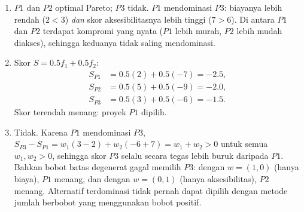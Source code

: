 \begin{enumerate}
\item $P1$ dan $P2$ optimal Pareto; $P3$ tidak. $P1$ mendominasi $P3$: biayanya
lebih rendah ($2 < 3$) \emph{dan} skor aksesibilitasnya lebih tinggi ($7 > 6$).
Di antara $P1$ dan $P2$ terdapat kompromi yang nyata ($P1$ lebih murah,
$P2$ lebih mudah diakses), sehingga keduanya tidak saling mendominasi.
\item Skor $S = 0.5 f_1 + 0.5 f_2$:
\begin{align*}
S_{P1} &= 0.5(2) + 0.5(-7) = -2.5, \\
S_{P2} &= 0.5(5) + 0.5(-9) = -2.0, \\
S_{P3} &= 0.5(3) + 0.5(-6) = -1.5.
\end{align*}
Skor terendah menang: proyek $P1$ dipilih.
\item Tidak. Karena $P1$ mendominasi $P3$,
$S_{P3} - S_{P1} = w_1(3-2) + w_2(-6+7) = w_1 + w_2 > 0$ untuk semua
$w_1, w_2 > 0$, sehingga skor $P3$ selalu secara tegas lebih buruk daripada
$P1$. Bahkan bobot batas degenerat gagal memilih $P3$: dengan $w = (1,0)$
(hanya biaya), $P1$ menang, dan dengan $w = (0,1)$ (hanya aksesibilitas), $P2$
menang. Alternatif terdominasi tidak pernah dapat dipilih dengan metode jumlah
berbobot yang menggunakan bobot positif.
\end{enumerate}


